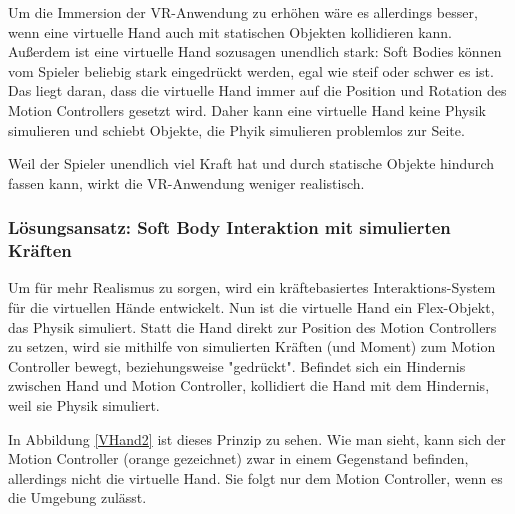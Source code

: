 
Um die Immersion der VR-Anwendung zu erhöhen wäre es allerdings besser, wenn eine virtuelle Hand auch mit statischen Objekten kollidieren kann. Außerdem ist eine virtuelle Hand sozusagen unendlich stark: Soft Bodies können vom Spieler beliebig stark eingedrückt werden, egal wie steif oder schwer es ist. Das liegt daran, dass die virtuelle Hand immer auf die Position und Rotation des Motion Controllers gesetzt wird. Daher kann eine virtuelle Hand keine Physik simulieren und schiebt Objekte, die Phyik simulieren problemlos zur Seite.

Weil der Spieler unendlich viel Kraft hat und durch statische Objekte hindurch fassen kann, wirkt die VR-Anwendung weniger realistisch.

\subsubsection{Lösungsansatz: Soft Body Interaktion mit simulierten Kräften}
Um für mehr Realismus zu sorgen, wird ein kräftebasiertes Interaktions-System für die virtuellen Hände entwickelt. Nun ist die virtuelle Hand ein Flex-Objekt, das Physik simuliert. Statt die Hand direkt zur Position des Motion Controllers zu setzen, wird sie mithilfe von simulierten Kräften (und Moment) zum Motion Controller bewegt, beziehungsweise "gedrückt". Befindet sich ein Hindernis zwischen Hand und Motion Controller, kollidiert die Hand mit dem Hindernis, weil sie Physik simuliert. 

In Abbildung \ref{VHand2} ist dieses Prinzip zu sehen. Wie man sieht, kann sich der Motion Controller (orange gezeichnet) zwar in einem Gegenstand befinden, allerdings nicht die virtuelle Hand. Sie folgt nur dem Motion Controller, wenn es die Umgebung zulässt.


